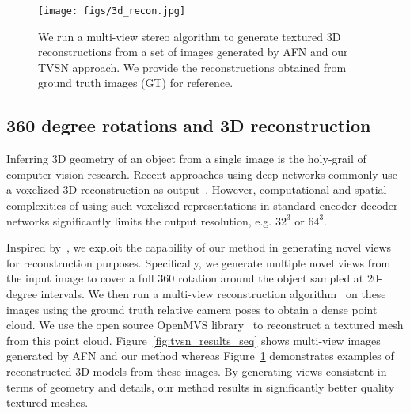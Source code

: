 \documentclass[10pt,twocolumn,letterpaper]{article}
\newcommand{\duygu}[1]{\textcolor{magenta}{\textbf{Duygu: #1}}}
\begin{document}
\begin{figure}[t]
\vspace{-2mm}
\begin{center}
\texttt{[image: figs/3d\_recon.jpg]}
\end{center}
\caption{We run a multi-view stereo algorithm to generate textured 3D reconstructions from a set of images generated by AFN and our TVSN approach. We provide the reconstructions obtained from ground truth images (GT) for reference.}
\label{fig:3d_reconstruction}
\vspace{-2mm}
\vspace{-2mm}
\end{figure}

\subsection{360 degree rotations and 3D reconstruction}

Inferring 3D geometry of an object from a single image is the holy-grail of computer vision research. Recent approaches using deep networks commonly use a voxelized 3D reconstruction as output~\cite{choy_eccv2016,we_nips2016}. However, computational and spatial complexities of using such voxelized representations in standard encoder-decoder networks significantly limits the output resolution, e.g. $32^3$ or $64^3$. %

Inspired by~\cite{tatarchenko_eccv2016}, we exploit the capability of our method in generating novel views for reconstruction purposes. Specifically, we generate multiple novel views from the input image to cover a full 360 rotation around the object sampled at $20$-degree intervals. We then run a multi-view reconstruction algorithm~\cite{furukawa_mvs} on these images using the ground truth relative camera poses to obtain a dense point cloud. We use the open source OpenMVS library~\cite{openMVS} to reconstruct a textured mesh from this point cloud. Figure~\ref{fig:tvsn_results_seq} shows multi-view images generated by AFN and our method whereas Figure~\ref{fig:3d_reconstruction} demonstrates examples of reconstructed 3D models from these images. By generating views consistent in terms of geometry and details, our method results in significantly better quality textured meshes.
\end{document}
